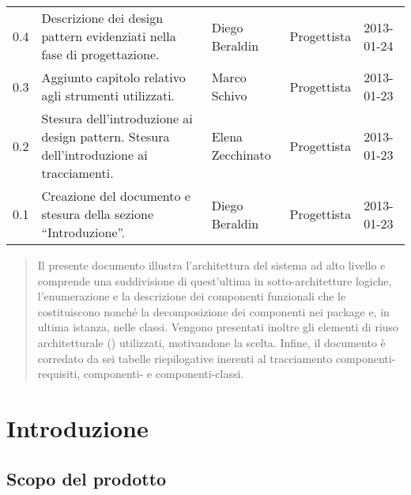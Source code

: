 \begin{center}
\begin{longtable}{lp{}lll}
0.4 & Descrizione dei design pattern evidenziati nella fase di progettazione. &Diego Beraldin & Progettista & 2013-01-24\\
0.3 & Aggiunto capitolo relativo agli strumenti utilizzati.& Marco Schivo & Progettista & 2013-01-23\\
0.2 & Stesura dell'introduzione ai design pattern. Stesura dell'introduzione ai tracciamenti. &Elena Zecchinato & Progettista & 2013-01-23\\
0.1 & Creazione del documento e stesura della sezione ``Introduzione''. &Diego Beraldin & Progettista & 2013-01-23\\
\bottomrule
\end{longtable}
\end{center}
\clearpage



\setcounter{page}{1}
\pagestyle{normal}

\clearpage

\begin{abstract}
Il presente documento illustra l'architettura del sistema ad alto livello e comprende una suddivisione di quest'ultima in sotto-architetture logiche, l'enumerazione e la descrizione dei componenti funzionali che le costituiscono nonché la decomposizione dei componenti nei package e, in ultima istanza, nelle classi. Vengono presentati inoltre gli elementi di riuso architetturale () utilizzati, motivandone la scelta. Infine, il documento è corredato da sei tabelle riepilogative inerenti al tracciamento componenti-requisiti, componenti-\underline{} e componenti-classi.
\end{abstract}
\clearpage

\section{Introduzione}
\subsection{Scopo del prodotto}
\purpose

